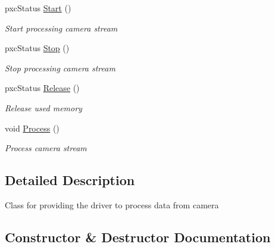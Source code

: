 \begin{DoxyCompactItemize}
pxc\+Status \hyperlink{class_emotions_tracker_a054e0ccebc638d54b6deb1ec60f660e3}{Start} ()
\begin{DoxyCompactList}\small\item\em Start processing camera stream \end{DoxyCompactList}\item 
\mbox{\label{class_emotions_tracker_a7b78dbd1a9ddc028b2c7ada76d5c42e5}} 
pxc\+Status \hyperlink{class_emotions_tracker_a7b78dbd1a9ddc028b2c7ada76d5c42e5}{Stop} ()
\begin{DoxyCompactList}\small\item\em Stop processing camera stream \end{DoxyCompactList}\item 
\mbox{\label{class_emotions_tracker_adf4a570762e9f01338acbfd9f41ce1b6}} 
pxc\+Status \hyperlink{class_emotions_tracker_adf4a570762e9f01338acbfd9f41ce1b6}{Release} ()
\begin{DoxyCompactList}\small\item\em Release used memory \end{DoxyCompactList}\item 
\mbox{\label{class_emotions_tracker_a49efddf4954f06dd0c1b78bc84a7f12d}} 
void \hyperlink{class_emotions_tracker_a49efddf4954f06dd0c1b78bc84a7f12d}{Process} ()
\begin{DoxyCompactList}\small\item\em Process camera stream \end{DoxyCompactList}\end{DoxyCompactItemize}


\subsection{Detailed Description}
Class for providing the driver to process data from camera 

\subsection{Constructor \& Destructor Documentation}
\mbox{\label{class_emotions_tracker_a3fe760d853d9f56830ad241cfea10aeb}} 
